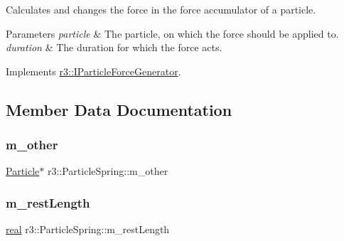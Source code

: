 Calculates and changes the force in the force accumulator of a particle. 


\begin{DoxyParams}{Parameters}
{\em particle} & The particle, on which the force should be applied to. \\
\hline
{\em duration} & The duration for which the force acts. \\
\hline
\end{DoxyParams}


Implements \mbox{\hyperlink{classr3_1_1_i_particle_force_generator_a8b692fc3a40f815dc44c106b451c3a90}{r3\+::\+I\+Particle\+Force\+Generator}}.



\subsection{Member Data Documentation}
\mbox{\label{classr3_1_1_particle_spring_af24b9bb50ddd33152892d21c7fdacc8a}} 
\subsubsection{\texorpdfstring{m\+\_\+other}{m\_other}}
{\footnotesize\ttfamily \mbox{\hyperlink{classr3_1_1_particle}{Particle}}$\ast$ r3\+::\+Particle\+Spring\+::m\+\_\+other\hspace{0.3cm}{\ttfamily [protected]}}

\mbox{\label{classr3_1_1_particle_spring_a0ec4f3526a00ef338659c9ea4baf998b}} 
\subsubsection{\texorpdfstring{m\+\_\+rest\+Length}{m\_restLength}}
{\footnotesize\ttfamily \mbox{\hyperlink{namespacer3_ab2016b3e3f743fb735afce242f0dc1eb}{real}} r3\+::\+Particle\+Spring\+::m\+\_\+rest\+Length\hspace{0.3cm}{\ttfamily [protected]}}

\mbox{\label{classr3_1_1_particle_spring_ad7386065bad41fc076f6882856923db7}} 
